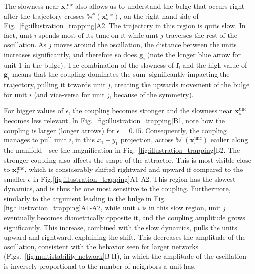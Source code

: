 The slowness near $\mathbf{x}_s^\mathrm{unc}$ also allows us to understand the bulge that occurs right after the trajectory crosses $\mathbb{W}^s(\mathbf{x}_s^\mathrm{unc})$, on the right-hand side of Fig.~\ref{fig:illustration_trapping}A2. The trajectory in this region is quite slow. In fact, unit $i$ spends most of its time on it while unit $j$ traverses the rest of the oscillation. As $j$ moves around the oscillation, the distance between the units increases significantly, and therefore so does $\mathbf{g}_i$ (note the longer blue arrow for unit 1 in the bulge). The combination of the slowness of $\mathbf{f}_i$ and the high value of $\mathbf{g}_i$ means that the coupling dominates the sum, significantly impacting the trajectory, pulling it towards unit $j$, creating the upwards movement of the bulge for unit $i$ (and vice-versa for unit $j$, because of the symmetry). 

For bigger values of $\epsilon$, the coupling becomes stronger and the slowness near $\mathbf{x}_s^\mathrm{unc}$ becomes less relevant. In Fig.~\ref{fig:illustration_trapping}B1, note how the coupling is larger (longer arrows) for $\epsilon = 0.15$. Consequently, the coupling manages to pull unit $i$, in this $x_1-y_1$ projection, across $\mathbb{W}^s(\mathbf{x}_s^\mathrm{unc})$ earlier along the manifold - see the magnification in Fig.~\ref{fig:illustration_trapping}B2. 
The stronger coupling also affects the shape of the attractor. This is most visible close to $\mathbf{x}_s^\mathrm{unc}$, which is considerably shifted rightward and upward if compared to the smaller $\epsilon$ in Fig.\ref{fig:illustration_trapping}A1-A2. This region has the slowest dynamics, and is thus the one most sensitive to the coupling. Furthermore, similarly to the argument leading to the bulge in Fig.\ref{fig:illustration_trapping}A1-A2, while unit $i$ is in this slow region, unit $j$ eventually becomes diametrically opposite it, and the coupling amplitude grows significantly. This increase, combined with the slow dynamics, pulls the units upward and rightward, explaining the shift. This decreases the amplitude of the oscillation, consistent with the behavior seen for larger networks (Figs.~\ref{fig:multistability-network}B-H), in which the amplitude of the oscillation is inversely proportional to the number of neighbors a unit has.

